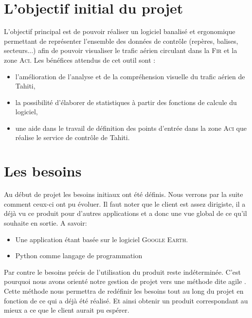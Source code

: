  
\section{L'objectif initial du projet}
L’objectif principal est de pouvoir réaliser un logiciel banalisé et ergonomique permettant de
représenter l’ensemble des données de contrôle (repères, balises, secteurs...) afin de pouvoir
visualiser le trafic aérien circulant dans la \textsc{Fir} et la zone \textsc{Aci}.
Les bénéfices attendus de cet outil sont :
\begin{itemize}
\item l’amélioration de l’analyse et de la compréhension visuelle du trafic aérien de Tahiti,
\item la possibilité d’élaborer de statistiques à partir des fonctions de calcule du logiciel,
\item une aide dans le travail de définition des points d’entrée dans la zone \textsc{Aci} que réalise le
service de contrôle de Tahiti.
\end{itemize}

\section{Les besoins}
Au début de projet les besoins initiaux ont été définis. Nous verrons par la suite comment ceux-ci ont pu évoluer. Il faut noter que le client est assez dirigiste, il a déjà vu ce produit pour d'autres applications et a donc une vue global de ce qu'il souhaite en sortie. A savoir:
\begin{itemize}
    \item Une application étant basée sur le logiciel \textsc{Google Earth}.
    \item Python comme langage de programmation
\end{itemize}
Par contre le besoins précis de l'utilisation du produit reste indéterminée. C'est pourquoi nous avons orienté notre gestion de projet vers une méthode dite agile . Cette méthode nous permettra de redéfinir les besoins tout au long du projet en fonction de ce qui a déjà été réalisé. Et ainsi obtenir un produit correspondant au mieux a ce que le client aurait pu espérer.

